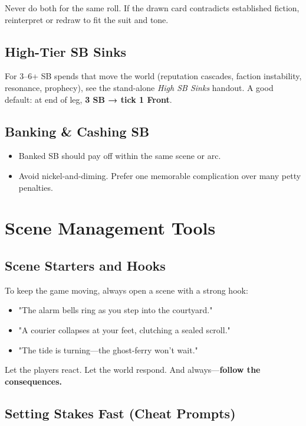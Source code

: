 Never do both for the same roll. If the drawn card contradicts established fiction, reinterpret or redraw to fit the suit and tone.

\subsection{High-Tier SB Sinks}
For 3--6+ SB spends that move the world (reputation cascades, faction instability, resonance, prophecy), see the stand-alone \emph{High SB Sinks} handout. A good default: at end of leg, \textbf{3 SB → tick 1 Front}.

\subsection{Banking \& Cashing SB}

\begin{itemize}
    \item Banked SB should pay off within the same scene or arc.
    \item Avoid nickel-and-diming. Prefer one memorable complication over many petty penalties.
\end{itemize}

\section{Scene Management Tools}

\subsection{Scene Starters and Hooks}

To keep the game moving, always open a scene with a strong hook:

\begin{itemize}
    \item "The alarm bells ring as you step into the courtyard."
    \item "A courier collapses at your feet, clutching a sealed scroll."
    \item "The tide is turning---the ghost-ferry won't wait."
\end{itemize}

Let the players react. Let the world respond. And always---\textbf{follow the consequences.}

\subsection{Setting Stakes Fast (Cheat Prompts)}

